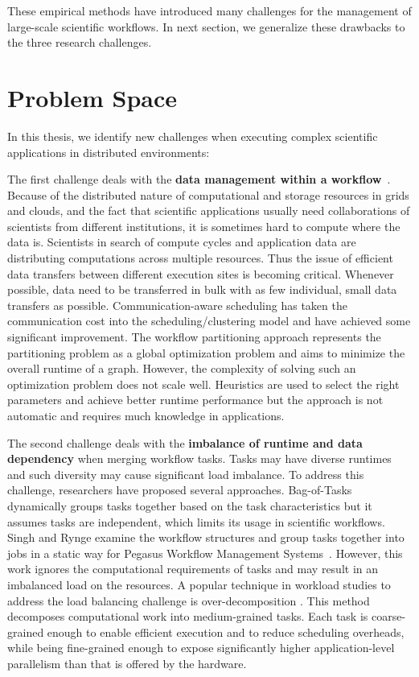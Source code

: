 These empirical methods have introduced many challenges for the management of large-scale scientific workflows. In next section, we generalize these drawbacks to the three research challenges. 

\section{Problem Space}

In this thesis, we identify new challenges when executing complex scientific applications in distributed environments:

The first challenge deals with the \textbf{data management within a workflow}~\cite{wang2013supporting, wang2012scimate, wang2014removing}. 
Because of the distributed nature of computational and storage resources in grids and clouds, and the fact that scientific applications usually need collaborations of scientists from different institutions, it is sometimes hard to compute where the data is. Scientists in search of compute cycles and application data are distributing computations across multiple resources. 
Thus the issue of efficient data transfers between different execution sites is becoming critical. Whenever possible, data need to be transferred in bulk with as few individual, small data transfers as possible. 
Communication-aware scheduling \cite{Sonmez2006, Jones2004} has taken the communication cost into the scheduling/clustering model and have achieved some significant improvement. The workflow partitioning approach \cite{Hedayat2009, Yuan2010, Wieczorek2005,Rubing2005} represents the partitioning problem as a global optimization problem and aims to minimize the overall runtime of a graph. However, the complexity of solving such an optimization problem does not scale well. Heuristics \cite{Maheshwari2012, Callaghan2010} are used to select the right parameters and achieve better runtime performance but the approach is not automatic and requires much knowledge in applications. 


The second challenge deals with the \textbf{imbalance of runtime and data dependency} when merging workflow tasks. Tasks may have diverse runtimes and such diversity may cause significant load imbalance. To address this challenge, researchers have proposed several approaches. Bag-of-Tasks \cite{Hussin2010, Celaya2010, Oprescu2010} dynamically groups tasks together based on the task characteristics but it assumes tasks are independent, which limits its usage in scientific workflows. Singh \cite{Singh2008} and Rynge \cite{Rynge2012} examine the workflow structures and group tasks together into jobs in a static way for Pegasus Workflow Management Systems~\cite{Deelman2004}.
However, this work ignores the computational requirements of tasks and may result in an imbalanced load on the resources. A popular technique in workload studies to address the load balancing challenge is over-decomposition \cite{Lifflander2012}. This method decomposes computational work into medium-grained tasks. Each task is coarse-grained enough to enable efficient execution and to reduce scheduling overheads, while being fine-grained enough to expose significantly higher application-level parallelism than that is offered by the hardware. 

